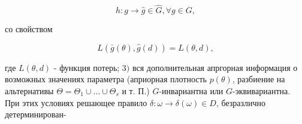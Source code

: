 \documentclass[10pt]{article}
\begin{document}
\[

h: g \rightarrow \hat{g} \in \hat{G}, \forall g \in G,

\]



со свойством



\[

L(\bar{g}(\theta), \hat{g}(d))=L(\theta, d),

\]



где $L(\theta, d)$ - функция потерь; 3$)$ вся дополнительная апргорная информация о возможных значениях параметра (априорная плотность $p(\theta)$, разбиение на альтернативы $\Theta=\Theta_{1} \cup \ldots \cup \Theta_{s}$ и т. П.) $G$-инвариантна или $G$-эквивариантна. При этих условиях решающее правило $\delta: \omega \rightarrow \delta(\omega) \in D$, безразлично детерминирован-
\end{document}
